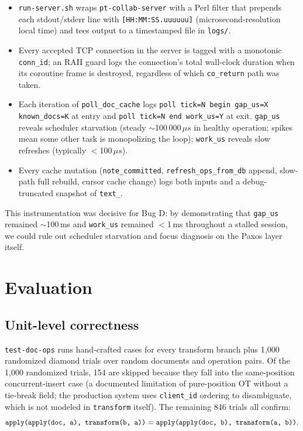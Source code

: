 \documentclass[11pt]{article}
\newcommand{\code}[1]{\texttt{#1}}
\begin{document}
\begin{itemize}[leftmargin=*,itemsep=0.1em]
  \item \code{run-server.sh} wraps \code{pt-collab-server} with a Perl filter that prepends each stdout/stderr line with \code{[HH:MM:SS.uuuuuu]} (microsecond-resolution local time) and tees output to a timestamped file in \code{logs/}.
  \item Every accepted TCP connection in the server is tagged with a monotonic \code{conn\_id}; an RAII guard logs the connection's total wall-clock duration when its coroutine frame is destroyed, regardless of which \code{co\_return} path was taken.
  \item Each iteration of \code{poll\_doc\_cache} logs \code{poll tick=N begin gap\_us=X known\_docs=K} at entry and \code{poll tick=N end work\_us=Y} at exit. \code{gap\_us} reveals scheduler starvation (steady $\sim$100\,000\,$\mu s$ in healthy operation; spikes mean some other task is monopolizing the loop); \code{work\_us} reveals slow refreshes (typically $<$100\,$\mu s$).
  \item Every cache mutation (\code{note\_committed}, \code{refresh\_ops\_from\_db} append, slow-path full rebuild, cursor cache change) logs both inputs and a debug-truncated snapshot of \code{text\_}.
\end{itemize}

This instrumentation was decisive for Bug D: by demonstrating that \code{gap\_us} remained $\sim$100\,ms and \code{work\_us} remained $<$1\,ms throughout a stalled session, we could rule out scheduler starvation and focus diagnosis on the Paxos layer itself.

\section{Evaluation}

\subsection{Unit-level correctness}

\code{test-doc-ops} runs hand-crafted cases for every transform branch plus 1{,}000 randomized diamond trials over random documents and operation pairs. Of the 1{,}000 randomized trials, 154 are skipped because they fall into the same-position concurrent-insert case (a documented limitation of pure-position OT without a tie-break field; the production system uses \code{client\_id} ordering to disambiguate, which is not modeled in \code{transform} itself). The remaining 846 trials all confirm:
\[
  \text{\code{apply(apply(doc, a), transform(b, a))} $=$ \code{apply(apply(doc, b), transform(a, b))}}.
\]
\end{document}
